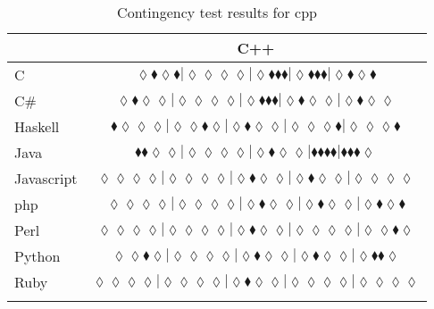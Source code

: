 \begin{table*}
\centering
\begin{tabular}{l c}
& C++ \\
\hline

C & $\scriptscriptstyle\lozenge\blacklozenge\lozenge\blacklozenge|\lozenge\lozenge\lozenge\lozenge|\lozenge\blacklozenge\blacklozenge\blacklozenge|\lozenge\blacklozenge\blacklozenge\blacklozenge|\lozenge\blacklozenge\lozenge\blacklozenge$ \\
C\# & $\scriptscriptstyle\lozenge\blacklozenge\lozenge\lozenge|\lozenge\lozenge\lozenge\lozenge|\lozenge\blacklozenge\blacklozenge\blacklozenge|\lozenge\blacklozenge\lozenge\lozenge|\lozenge\blacklozenge\lozenge\lozenge$ \\
Haskell & $\scriptscriptstyle\blacklozenge\lozenge\lozenge\lozenge|\lozenge\lozenge\blacklozenge\lozenge|\lozenge\blacklozenge\lozenge\lozenge|\lozenge\lozenge\lozenge\blacklozenge|\lozenge\lozenge\lozenge\blacklozenge$ \\
Java & $\scriptscriptstyle\blacklozenge\blacklozenge\lozenge\lozenge|\lozenge\lozenge\lozenge\lozenge|\lozenge\blacklozenge\lozenge\lozenge|\blacklozenge\blacklozenge\blacklozenge\blacklozenge|\blacklozenge\blacklozenge\blacklozenge\lozenge$ \\
Javascript & $\scriptscriptstyle\lozenge\lozenge\lozenge\lozenge|\lozenge\lozenge\lozenge\lozenge|\lozenge\blacklozenge\lozenge\lozenge|\lozenge\blacklozenge\lozenge\lozenge|\lozenge\lozenge\lozenge\lozenge$ \\
{\sc php} & $\scriptscriptstyle\lozenge\lozenge\lozenge\lozenge|\lozenge\lozenge\lozenge\lozenge|\lozenge\blacklozenge\lozenge\lozenge|\lozenge\blacklozenge\lozenge\lozenge|\lozenge\blacklozenge\lozenge\blacklozenge$ \\
Perl & $\scriptscriptstyle\lozenge\lozenge\lozenge\lozenge|\lozenge\lozenge\lozenge\lozenge|\lozenge\blacklozenge\lozenge\lozenge|\lozenge\lozenge\lozenge\lozenge|\lozenge\lozenge\blacklozenge\lozenge$ \\
Python & $\scriptscriptstyle\lozenge\lozenge\blacklozenge\lozenge|\lozenge\lozenge\lozenge\lozenge|\lozenge\blacklozenge\lozenge\lozenge|\lozenge\blacklozenge\lozenge\lozenge|\lozenge\blacklozenge\blacklozenge\lozenge$ \\
Ruby & $\scriptscriptstyle\lozenge\lozenge\lozenge\lozenge|\lozenge\lozenge\lozenge\lozenge|\lozenge\blacklozenge\lozenge\lozenge|\lozenge\lozenge\lozenge\lozenge|\lozenge\lozenge\lozenge\lozenge$ \\

\hline
& \\
\end{tabular}
\caption{Contingency test results for cpp}
\label{tbl:contingency-test-results-cpp}
\end{table*}



